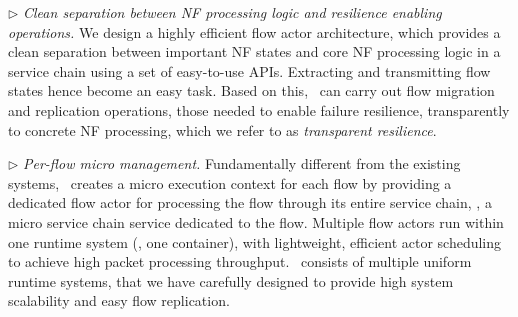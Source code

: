 $\triangleright$ {\em Clean separation between NF processing logic and resilience enabling operations.} %
 We design a highly efficient flow actor architecture, which provides a clean separation between important NF states and core NF processing logic in a service chain using a set of easy-to-use APIs. Extracting and transmitting flow states hence become an easy task. Based on this, \nfactor~can carry out flow migration and replication operations, those needed to enable failure resilience, transparently to concrete NF processing, which we refer to as {\em transparent resilience}. %


$\triangleright$ {\em Per-flow micro management.} Fundamentally different from the existing systems, \nfactor~creates a micro execution context for each flow by providing a dedicated flow actor for processing the flow through its entire service chain, \ie, %
a micro service chain service dedicated to the flow.
 Multiple flow actors run within one runtime system (\eg, one container), with lightweight, efficient actor scheduling to achieve high packet processing throughput. \nfactor~consists of multiple uniform runtime systems, that we have carefully designed to provide high system scalability and easy flow replication. %


